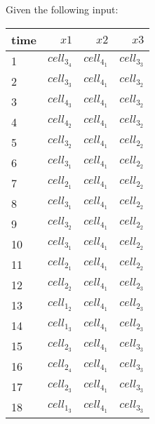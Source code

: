 
Given the following input:
\begin{table}[ht!]
\begin{center}
\begin{tabular}{|l|r|r|r|}
\hline
time & $\mathit{x}1$& $\mathit{x}2$& $\mathit{x}3$\\
\hline
1 & $\mathit{cell}_3_4$& $\mathit{cell}_4_1$& $\mathit{cell}_3_3$ \\
2 & $\mathit{cell}_3_3$& $\mathit{cell}_4_1$& $\mathit{cell}_3_2$ \\
3 & $\mathit{cell}_4_3$& $\mathit{cell}_4_1$& $\mathit{cell}_3_2$ \\
4 & $\mathit{cell}_4_2$& $\mathit{cell}_4_1$& $\mathit{cell}_3_2$ \\
5 & $\mathit{cell}_3_2$& $\mathit{cell}_4_1$& $\mathit{cell}_2_2$ \\
6 & $\mathit{cell}_3_1$& $\mathit{cell}_4_1$& $\mathit{cell}_2_2$ \\
7 & $\mathit{cell}_2_1$& $\mathit{cell}_4_1$& $\mathit{cell}_2_2$ \\
8 & $\mathit{cell}_3_1$& $\mathit{cell}_4_1$& $\mathit{cell}_2_2$ \\
9 & $\mathit{cell}_3_2$& $\mathit{cell}_4_1$& $\mathit{cell}_2_2$ \\
10 & $\mathit{cell}_3_1$& $\mathit{cell}_4_1$& $\mathit{cell}_2_2$ \\
11 & $\mathit{cell}_2_1$& $\mathit{cell}_4_1$& $\mathit{cell}_2_2$ \\
12 & $\mathit{cell}_2_2$& $\mathit{cell}_4_1$& $\mathit{cell}_2_3$ \\
13 & $\mathit{cell}_1_2$& $\mathit{cell}_4_1$& $\mathit{cell}_2_3$ \\
14 & $\mathit{cell}_1_3$& $\mathit{cell}_4_1$& $\mathit{cell}_2_3$ \\
15 & $\mathit{cell}_2_3$& $\mathit{cell}_4_1$& $\mathit{cell}_3_3$ \\
16 & $\mathit{cell}_2_4$& $\mathit{cell}_4_1$& $\mathit{cell}_3_3$ \\
17 & $\mathit{cell}_2_3$& $\mathit{cell}_4_1$& $\mathit{cell}_3_3$ \\
18 & $\mathit{cell}_1_3$& $\mathit{cell}_4_1$& $\mathit{cell}_3_3$ \\
\hline
\end{tabular}
\end{center}
\end{table}

